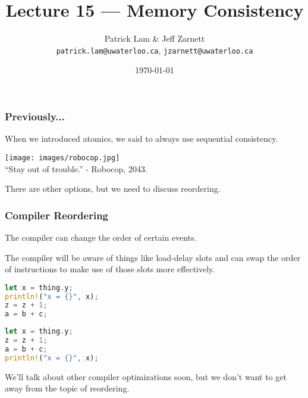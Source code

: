 


\title{Lecture 15 --- Memory Consistency}

\author{Patrick Lam \& Jeff Zarnett\\ \small \texttt{patrick.lam@uwaterloo.ca}, \texttt{jzarnett@uwaterloo.ca}}
\date{\today}




\begin{frame}
  \titlepage
 \end{frame}
 
 
\begin{frame}
\frametitle{Previously...}

When we introduced atomics, we said to always use sequential consistency.

\begin{center}
	\texttt{[image: images/robocop.jpg]}\\
	\hfill ``Stay out of trouble.'' - Robocop, 2043.
\end{center}

There are other options, but we need to discuss reordering.

\end{frame}



\begin{frame}[fragile]
\frametitle{Compiler Reordering}
The compiler can change the order of certain events. 

The compiler will be aware of things like load-delay slots and can swap the order of instructions to make use of those slots more effectively.

\begin{multicols}{2}
\begin{lstlisting}[language=Rust]
let x = thing.y;
println!("x = {}", x);
z = z + 1;
a = b + c;
\end{lstlisting}
\columnbreak
\begin{lstlisting}[language=Rust]
let x = thing.y;
z = z + 1;
a = b + c;
println!("x = {}", x);
\end{lstlisting}
\end{multicols}

We'll talk about other compiler optimizations soon, but we don't want to get away from the topic of reordering. 

\end{frame}


